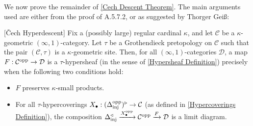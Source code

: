 \documentclass[10pt]{article}
\newcommand{\C}{\mathcal C}
\newcommand{\cD}{\mathcal{D}}
\theoremstyle{witharg}
\theoremstyle{witharg}
\theoremstyle{witharg2}
\newcommand{\sss}{{\fontfamily{lmr}\selectfont\ss}}
\begin{document}
We now prove the remainder of \ref{Cech Descent Theorem}. The main arguments used are either from the proof of  A.5.7.2, or as suggested by Thorger Gei\sss:


\noindent 





\begin{corollary}{}[\v{C}ech Hyperdescent]\label{Chech Hyperdescent} Fix a (possibly large) regular cardinal $\kappa$, and let $\C$ be a $\kappa$-geometric $(\infty,1)$-category. Let $\tau$ be a Grothendieck pretopology on $\C$ such that the pair $(\C,\tau)$ is a $\kappa$-geometric site. Then, for all $(\infty,1)$-categories $\cD$, a map $F:\C^{\textnormal{opp}}\rightarrow \cD$ is a $\tau$-hypersheaf (in the sense of \ref{Hypersheaf Definition}) precisely when the following two conditions hold:

    \begin{itemize}

        \item [$(1)$] $F$ preserves $\kappa$-small products. 

        \item [$(2)$] For all $\tau$-hypercoverings $X_\bullet:(\Delta^{\textnormal{opp}}_{\textnormal{inj}})^\triangleright\rightarrow \C$ (as defined in \ref{Hypercoverings Definition}), the composition $\Delta_{\textnormal{inj}}^\triangleleft\xrightarrow{X_\bullet^{\textnormal{opp}}}\C^{\textnormal{opp}}\xrightarrow{F}\cD$ is a limit diagram.

    \end{itemize}
    
\end{corollary}




    
\end{document}
